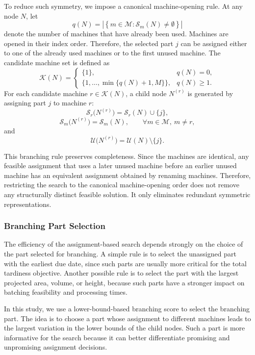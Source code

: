 \documentclass[letterpaper, 10 pt, conference]{ieeeconf}  %
\begin{document}
To reduce such symmetry, we impose a canonical machine-opening rule. At any
node $N$, let
\[
q(N)=
\left|
\left\{
m\in\mathcal{M}:\mathcal{S}_m(N)\neq\emptyset
\right\}
\right|
\]
denote the number of machines that have already been used. Machines are
opened in their index order. Therefore, the selected part $j$ can be
assigned either to one of the already used machines or to the first unused
machine. The candidate machine set is defined as
\[
\mathcal{K}(N)=
\begin{cases}
	\{1\}, & q(N)=0,\\[2mm]
	\{1,\dots,\min\{q(N)+1,M\}\}, & q(N)\ge 1.
\end{cases}
\]
For each candidate machine $r\in\mathcal{K}(N)$, a child node $N^{(r)}$ is
generated by assigning part $j$ to machine $r$:
\[
\mathcal{S}_r\bigl(N^{(r)}\bigr)
=
\mathcal{S}_r(N)\cup\{j\},
\]
\[
\mathcal{S}_m\bigl(N^{(r)}\bigr)
=
\mathcal{S}_m(N),
\qquad \forall m\in\mathcal{M},\ m\neq r,
\]
and
\[
\mathcal{U}\bigl(N^{(r)}\bigr)
=
\mathcal{U}(N)\setminus\{j\}.
\]

This branching rule preserves completeness. Since the machines are
identical, any feasible assignment that uses a later unused machine before
an earlier unused machine has an equivalent assignment obtained by
renaming machines. Therefore, restricting the search to the canonical
machine-opening order does not remove any structurally distinct feasible
solution. It only eliminates redundant symmetric representations.

\subsubsection{Branching Part Selection}

The efficiency of the assignment-based search depends strongly on the
choice of the part selected for branching. A simple rule is to select the
unassigned part with the earliest due date, since such parts are usually
more critical for the total tardiness objective. Another possible rule is
to select the part with the largest projected area, volume, or height,
because such parts have a stronger impact on batching feasibility and
processing times.

In this study, we use a lower-bound-based branching score to select the
branching part. The idea is to choose a part whose assignment to different
machines leads to the largest variation in the lower bounds of the child
nodes. Such a part is more informative for the search because it can better
differentiate promising and unpromising assignment decisions.
\end{document}
